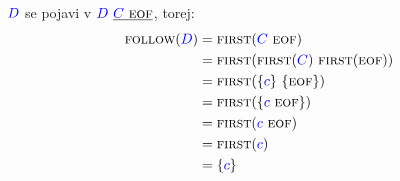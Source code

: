 \documentclass{article}
\newcommand{\Ex}{\textbf{Npr.:}\ }
\newcommand{\FIRST}{\textsc{first}}
\newcommand{\FOLLOW}{\textsc{follow}}
\newcommand{\EOF}{\textsc{eof}}
\newcommand{\Symbol}[1]{\textcolor{blue}{#1}}
\newcommand{\Grammar}{G}
\newcommand{\Null}{\varepsilon}
\newcommand{\Arrow}{\Coloneq}
\newcommand{\Seq}{\ }
\newcommand{\Union}{\mathrel{|}}
\begin{document}
$\Symbol{D}$ se pojavi v $\Symbol{D} \Seq \underline{\Symbol{C} \Seq \EOF}$, torej:
\begin{align*}
  \FOLLOW(\Symbol{D}) &= \FIRST(\Symbol{C} \Seq \EOF) \\
             &= \FIRST(\FIRST(\Symbol{C}) \Seq \FIRST(\EOF))\\
             &= \FIRST(\{\Symbol{c}\} \Seq \{\EOF\})\\
             &= \FIRST(\{\Symbol{c} \Seq \EOF\})\\
             &= \FIRST(\Symbol{c} \Seq \EOF) \\
             &= \FIRST(\Symbol{c})\\
             &= \{\Symbol{c}\}
\end{align*}


%
%
%
%
\end{document}
